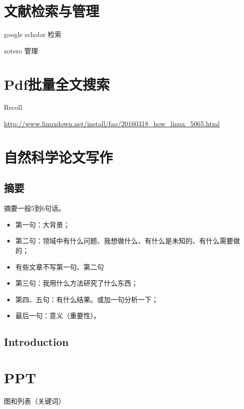 \section{文献检索与管理}
google scholar 检索

zotero 管理

\section{Pdf批量全文搜索}
Recoll

\url{http://www.linuxdown.net/install/faq/20160318_how_linux_5065.html}




\section{自然科学论文写作}
\subsection{摘要}
摘要一般5到6句话。
\begin{itemize}
\item 第一句：大背景；
\item 第二句：领域中有什么问题、我想做什么、有什么是未知的、有什么需要做的；
\item 有些文章不写第一句、第二句
\item 第三句：我用什么方法研究了什么东西；
\item 第四、五句：有什么结果。或加一句分析一下；
\item 最后一句：意义（重要性）。
\end{itemize}


\subsection{Introduction}



\section{PPT}
图和列表（关键词）













